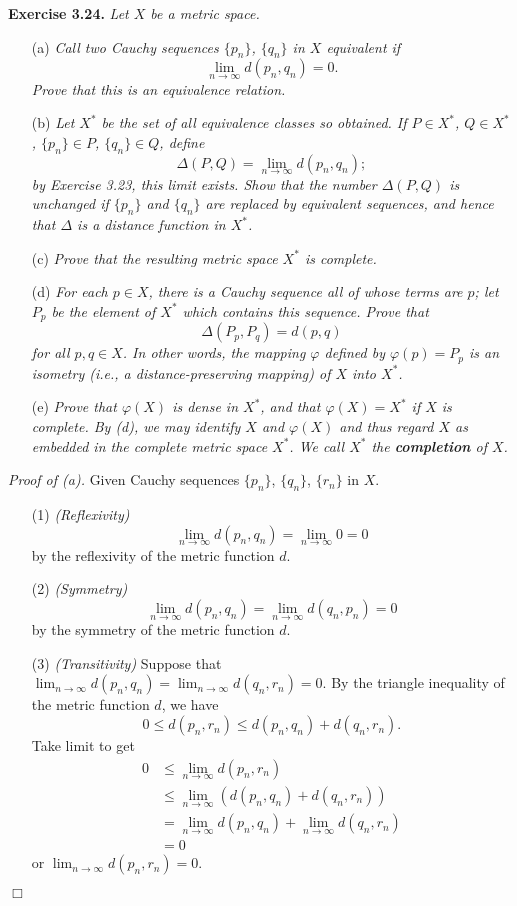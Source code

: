 \documentclass{article}
\begin{document}



\textbf{Exercise 3.24.}
\emph{Let $X$ be a metric space.}
\begin{enumerate}
\item[(a)]
\emph{Call two Cauchy sequences $\{p_n\}$, $\{q_n\}$ in $X$ equivalent if
$$\lim_{n \to \infty}{d(p_n,q_n)} = 0.$$
Prove that this is an equivalence relation.}
\item[(b)]
\emph{Let $X^*$ be the set of all equivalence classes so obtained.
If $P \in X^*$, $Q \in X^*$, $\{p_n\} \in P$, $\{q_n\} \in Q$, define
$$\Delta(P,Q) = \lim_{n \to \infty} d(p_n,q_n);$$
by Exercise 3.23, this limit exists.
Show that the number
$\Delta(P,Q)$ is unchanged if $\{p_n\}$ and $\{q_n\}$ are replaced by equivalent sequences,
and hence that $\Delta$ is a distance function in $X^*$.}
\item[(c)]
\emph{Prove that the resulting metric space $X^*$ is complete.}
\item[(d)]
\emph{For each $p \in X$, there is a Cauchy sequence all of whose terms are $p$;
let $P_p$ be the element of $X^*$ which contains this sequence.
Prove that
$$\Delta(P_p,P_q) = d(p,q)$$
for all $p,q \in X$.
In other words, the mapping $\varphi$ defined by $\varphi(p) = P_p$
is an isometry
(i.e., a distance-preserving mapping) of $X$ into $X^*$.}
\item[(e)]
\emph{Prove that $\varphi(X)$ is dense in $X^*$, and that $\varphi(X) = X^*$ if $X$ is complete.
By (d), we may identify $X$ and $\varphi(X)$
and thus regard $X$ as embedded in the complete metric space $X^*$.
We call $X^*$ the \textbf{completion} of $X$.} \\
\end{enumerate}



\emph{Proof of (a).}
Given Cauchy sequences $\{p_n\}$, $\{q_n\}$, $\{r_n\}$ in $X$.
\begin{enumerate}
\item[(1)]
\emph{(Reflexivity)}
$$\lim_{n \to \infty}{d(p_n,q_n)} = \lim_{n \to \infty} 0 = 0$$
by the reflexivity of the metric function $d$.
\item[(2)]
\emph{(Symmetry)}
$$\lim_{n \to \infty}{d(p_n,q_n)} = \lim_{n \to \infty}{d(q_n,p_n)} = 0$$
by the symmetry of the metric function $d$.
\item[(3)]
\emph{(Transitivity)}
Suppose that $\lim_{n \to \infty}{d(p_n,q_n)} = \lim_{n \to \infty}{d(q_n,r_n)} = 0$.
By the triangle inequality of the metric function $d$,
we have
$$0 \leq d(p_n,r_n) \leq d(p_n,q_n)+d(q_n,r_n).$$
Take limit to get
\begin{align*}
0
&\leq \lim_{n \to \infty}d(p_n,r_n) \\
&\leq \lim_{n \to \infty}(d(p_n,q_n)+d(q_n,r_n)) \\
&= \lim_{n \to \infty}d(p_n,q_n) + \lim_{n \to \infty}d(q_n,r_n) \\
&= 0
\end{align*}
or $\lim_{n \to \infty}d(p_n,r_n) = 0$.
\end{enumerate}
$\Box$ \\
\end{document}
